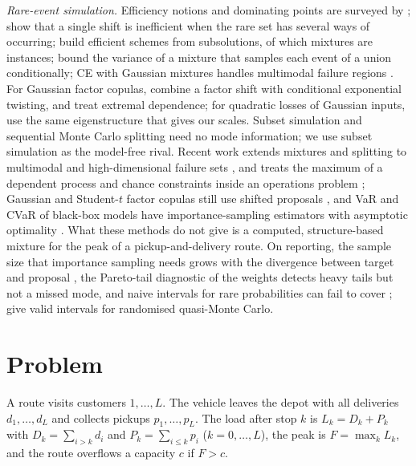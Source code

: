 \documentclass[11pt]{article}
\theoremstyle{definition}
\theoremstyle{remark}
\begin{document}
\emph{Rare-event simulation.} Efficiency notions and dominating points are
surveyed by \citet{AsmussenGlynn2007}; \citet{GlassermanWang1997} show that a
single shift is inefficient when the rare set has several ways of occurring;
\citet{DupuisWang2007} build efficient schemes from subsolutions, of which
mixtures are instances; \citet{OwenMaximovChertkov2019} bound the variance of a
mixture that samples each event of a union conditionally; CE with Gaussian
mixtures handles multimodal failure regions
\citep{KurtzSong2013,GeyerPapaioannouStraub2019,PapaioannouGeyerStraub2019}.
For Gaussian factor copulas, \citet{GlassermanLi2005} combine a factor shift
with conditional exponential twisting, and \citet{BassambooJunejaZeevi2008}
treat extremal dependence; for quadratic losses of Gaussian inputs,
\citet{GlassermanHeidelbergerShahabuddin2000} use the same eigenstructure that
gives our scales. Subset simulation \citep{AuBeck2001} and sequential Monte
Carlo splitting \citep{CerouDelMoralFuronGuyader2012} need no mode
information; we use subset simulation as the model-free rival. Recent work extends mixtures
and splitting to multimodal and high-dimensional failure sets
\citep{Helal2026Multimodal,Zhang2026GMM,Cerou2019Adaptive,Wagner2020Multilevel},
and treats the maximum of a dependent process \citep{Conroy2022Maxima} and
chance constraints inside an operations problem \citep{Lukashevich2024Chance};
Gaussian and Student-$t$ factor copulas still use shifted proposals
\citep{Fang2026ISCOS}, and VaR and CVaR of black-box models have importance-sampling
estimators with asymptotic optimality \citep{Deo2021Blackbox}. What these
methods do not give is a computed, structure-based mixture for the peak of a
pickup-and-delivery route. On reporting, the sample size that importance
sampling needs grows with the divergence between target and proposal
\citep{Chatterjee2018Sample}, the Pareto-tail diagnostic of the weights
\citep{Vehtari2024PSIS} detects heavy tails but not a missed mode, and
naive intervals for rare probabilities can fail to cover \citep{Bai2024Uncertainty};
\citet{LEcuyer2023RQMC} give valid intervals for randomised quasi-Monte Carlo.

\section{Problem}
\label{sec:problem}

A route visits customers $1,\dots,L$. The vehicle leaves the depot with all
deliveries $d_1,\dots,d_L$ and collects pickups $p_1,\dots,p_L$. The load after
stop $k$ is $L_k = D_k + P_k$ with $D_k = \sum_{i>k} d_i$ and
$P_k = \sum_{i\le k} p_i$ ($k=0,\dots,L$), the peak is $F = \max_k L_k$, and
the route overflows a capacity $c$ if $F > c$.
\end{document}
